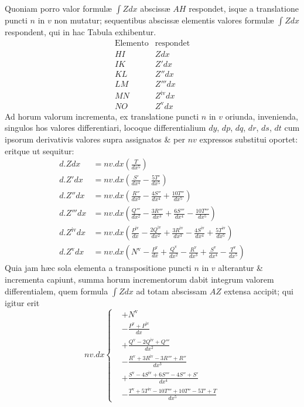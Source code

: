 Quoniam porro valor formulæ $\int Zdx$ abscissæ $AH$ respondet, isque a translatione puncti $n$ in $v$ non mutatur; sequentibus abscissæ elementis valores formulæ $\int Zdx$ respondent, qui in hac Tabula exhibentur.
\[\begin{array}{c|c}
\text{Elemento}&\text{respondet}\\
HI&Zdx\\IK&Z'dx\\KL&Z''dx\\LM&Z'''dx\\MN&Z^{\mathrm{iv}}dx\\NO&Z^{\mathrm{v}}dx
\end{array}\]
Ad horum valorum incrementa, ex translatione puncti $n$ in $v$ oriunda, invenienda, singulos hos valores differentiari, locoque differentialium $dy$, $dp$, $dq$, $dr$, $ds$, $dt$ cum ipsorum derivativis valores supra assignatos \& per $nv$ expressos substitui oportet: eritque ut sequitur:
\[\begin{aligned}
d.Zdx&=nv.dx\left(\frac T{dx^5}\right)\\
d.Z'dx&=nv.dx\left(\frac{S'}{dx^4}-\frac{5T'}{dx^5}\right)\\
d.Z''dx&=nv.dx\left(\frac{R''}{dx^3}-\frac{4S''}{dx^4}+\frac{10T''}{dx^5}\right)\\
d.Z'''dx&=nv.dx\left(\frac{Q'''}{dx^2}-\frac{3R'''}{dx^3}+\frac{6S'''}{dx^4}-\frac{10T'''}{dx^5}\right)\\
d.Z^{\mathrm{iv}}dx&=nv.dx\left(\frac{P^{\mathrm{iv}}}{dx}-\frac{2Q^{\mathrm{iv}}}{dx^2}+\frac{3R^{\mathrm{iv}}}{dx^3}-\frac{4S^{\mathrm{iv}}}{dx^4}+\frac{5T^{\mathrm{iv}}}{dx^5}\right)\\
d.Z^{\mathrm{v}}dx&=nv.dx\left(N^{\mathrm{v}}-\frac{P^{\mathrm{v}}}{dx}+\frac{Q^{\mathrm{v}}}{dx^2}-\frac{R^{\mathrm{v}}}{dx^3}+\frac{S^{\mathrm{v}}}{dx^4}-\frac{T^{\mathrm{v}}}{dx^5}\right)
\end{aligned}\]
Quia jam hæc sola elementa a transpositione puncti $n$ in $v$ alterantur \& incrementa capiunt, summa horum incrementorum dabit integrum valorem differentialem, quem formula $\int Zdx$ ad totam abscissam $AZ$ extensa accipit; qui igitur erit
\[nv.dx\left\{\begin{aligned}
&+N^{\mathrm{v}}\\
&-\frac{P^{\mathrm{v}}+P^{\mathrm{iv}}}{dx}\\
&+\frac{Q^{\mathrm{v}}-2Q^{\mathrm{iv}}+Q'''}{dx^2}\\
&-\frac{R^{\mathrm{v}}+3R^{\mathrm{iv}}-3R'''+R''}{dx^3}\\
&+\frac{S^{\mathrm{v}}-4S^{\mathrm{iv}}+6S'''-4S''+S'}{dx^4}\\
&-\frac{T^{\mathrm{v}}+5T^{\mathrm{iv}}-10T'''+10T''-5T'+T}{dx^5}
\end{aligned}\right.\]
